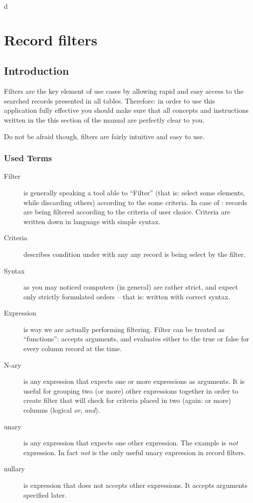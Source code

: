 d\section{Record filters}
\subsection{Introduction}
Filters are the key element of \OCS{} use cases by allowing rapid and easy access to the searched records presented in all tables.
Therefore: in order to use this application fully effective you should make sure that all concepts and instructions written in
the this section of the manual are perfectly clear to you.

Do not be afraid though, filters are fairly intuitive and easy to use.

\subsubsection{Used Terms}

\begin{description}
 \item[Filter] is generally speaking a tool able to ``Filter'' (that is: select some elements, while discarding others) according
 to the some criteria. In case of \OCS: records are being filtered according to the criteria of user choice. Criteria are written
 down in language with simple syntax.
 \item[Criteria] describes condition under with any any record is being select by the filter.
 \item[Syntax] as you may noticed computers (in general) are rather strict, and expect only strictly formulated orders -- that is:
 written with correct syntax.
 \item[Expression] is way we are actually performing filtering. Filter can be treated as ``functions'': accepts arguments, and evaluates
 either to the true or false for every column record at the time.
 \item[N-ary] is any expression that expects one or more expressions as arguments. It is useful for grouping two (or more) other expressions
 together in order to create filter that will check for criteria placed in two (again: or more) columns (logical \textit{or}, \textit{and}).
 \item[unary] is any expression that expects one other expression. The example is \textit{not} expression. In fact \textit{not} is the only useful
 unary expression in \OCS{} record filters.
 \item[nullary] is expression that does not accepts other expressions. It accepts arguments specified later.
\end{description}

